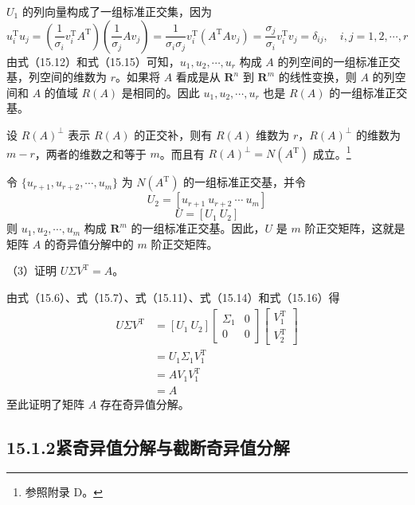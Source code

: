 \documentclass[UTF8,12pt,a4paper,fontset=fandol]{ctexart}
\begin{document}
$U_1$ 的列向量构成了一组标准正交集，因为
\begin{equation}
u_i^{\mathrm{T}}u_j
=\left(\frac{1}{\sigma_i}v_i^{\mathrm{T}}A^{\mathrm{T}}\right)\left(\frac{1}{\sigma_j}Av_j\right)
=\frac{1}{\sigma_i\sigma_j}v_i^{\mathrm{T}}(A^{\mathrm{T}}Av_j)
=\frac{\sigma_j}{\sigma_i}v_i^{\mathrm{T}}v_j
=\delta_{ij},\quad i,j=1,2,\cdots,r
\tag{15.15}
\end{equation}
由式（15.12）和式（15.15）可知，$u_1,u_2,\cdots,u_r$ 构成 $A$ 的列空间的一组标准正交基，列空间的维数为 $r$。如果将 $A$ 看成是从 $\mathbf{R}^n$ 到 $\mathbf{R}^m$ 的线性变换，则 $A$ 的列空间和 $A$ 的值域 $R(A)$ 是相同的。因此 $u_1,u_2,\cdots,u_r$ 也是 $R(A)$ 的一组标准正交基。

设 $R(A)^\perp$ 表示 $R(A)$ 的正交补，则有 $R(A)$ 维数为 $r$，$R(A)^\perp$ 的维数为 $m-r$，两者的维数之和等于 $m$。而且有 $R(A)^\perp=N(A^{\mathrm{T}})$ 成立。\footnote{参照附录 D。}

令 $\{u_{r+1},u_{r+2},\cdots,u_m\}$ 为 $N(A^{\mathrm{T}})$ 的一组标准正交基，并令
\[
U_2=[u_{r+1}\ u_{r+2}\ \cdots\ u_m]
\]
\begin{equation}
U=[U_1\ U_2]
\tag{15.16}
\end{equation}
则 $u_1,u_2,\cdots,u_m$ 构成 $\mathbf{R}^m$ 的一组标准正交基。因此，$U$ 是 $m$ 阶正交矩阵，这就是矩阵 $A$ 的奇异值分解中的 $m$ 阶正交矩阵。

（3）证明 $U\Sigma V^{\mathrm{T}}=A$。

由式（15.6）、式（15.7）、式（15.11）、式（15.14）和式（15.16）得
\begin{equation}
\begin{aligned}
U\Sigma V^{\mathrm{T}}
&=[U_1\ U_2]\begin{bmatrix}\Sigma_1&0\\0&0\end{bmatrix}
\begin{bmatrix}V_1^{\mathrm{T}}\\V_2^{\mathrm{T}}\end{bmatrix}\\
&=U_1\Sigma_1V_1^{\mathrm{T}}\\
&=AV_1V_1^{\mathrm{T}}\\
&=A
\end{aligned}
\tag{15.17}
\end{equation}
至此证明了矩阵 $A$ 存在奇异值分解。

\subsection*{15.1.2\quad 紧奇异值分解与截断奇异值分解}
\end{document}
